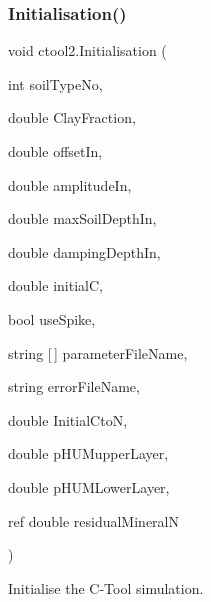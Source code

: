 \subsubsection{\texorpdfstring{Initialisation()}{Initialisation()}}
{\footnotesize\ttfamily void ctool2.\+Initialisation (\begin{DoxyParamCaption}\item[{int}]{soil\+Type\+No,  }\item[{double}]{Clay\+Fraction,  }\item[{double}]{offset\+In,  }\item[{double}]{amplitude\+In,  }\item[{double}]{max\+Soil\+Depth\+In,  }\item[{double}]{damping\+Depth\+In,  }\item[{double}]{initialC,  }\item[{bool}]{use\+Spike,  }\item[{string \mbox{[}$\,$\mbox{]}}]{parameter\+File\+Name,  }\item[{string}]{error\+File\+Name,  }\item[{double}]{Initial\+CtoN,  }\item[{double}]{p\+H\+U\+Mupper\+Layer,  }\item[{double}]{p\+H\+U\+M\+Lower\+Layer,  }\item[{ref double}]{residual\+MineralN }\end{DoxyParamCaption})\hspace{0.3cm}{\ttfamily [inline]}}



Initialise the C-\/\+Tool simulation. 


